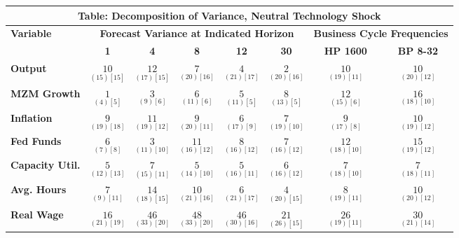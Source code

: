 \documentclass{article}
\begin{document}
 \begin{tabular}{|l|c|@{}c|c|@{}c|c|@{}c|c|} 
 \hline 
 \multicolumn{8}{|c|}{\textbf{Table: Decomposition of Variance, Neutral Technology Shock}} \\ \hline 
 \textbf{Variable} & \multicolumn{5}{|c}{\textbf{Forecast Variance at 
 Indicated Horizon}} & \multicolumn{2}{|c|}{\textbf{Business Cycle 
 Frequencies}} \\ \cline{2-8} 
 & \textbf{1} & \textbf{4} & \textbf{8} & \textbf{12} & \textbf{30} & \textbf{%
 HP 1600} & \textbf{BP 8-32} \\ \hline\hline 
 \textbf{Output} & $\underset{( 15) [ 15]}{ 10}$ & $\underset{( 17) [ 15]}{ 12}$ & $\underset{( 20) [ 16]}{  7}$ & $\underset{( 21) [ 17]}{  4}$ & $\underset{( 20) [ 16]}{  2}$ & $\underset{( 19) [ 11]}{ 10}$ & $\underset{( 20) [ 12]}{ 10}$ \\ \hline 
 \textbf{MZM Growth} & $\underset{(  4) [  5]}{  1}$ & $\underset{(  9) [  6]}{  3}$ & $\underset{( 11) [  6]}{  6}$ & $\underset{( 11) [  5]}{  5}$ & $\underset{( 13) [  5]}{  8}$ & $\underset{( 15) [  6]}{ 12}$ & $\underset{( 18) [ 10]}{ 16}$ \\ \hline 
 \textbf{Inflation} & $\underset{( 19) [ 18]}{  9}$ & $\underset{( 19) [ 12]}{ 11}$ & $\underset{( 20) [ 11]}{  9}$ & $\underset{( 17) [  9]}{  6}$ & $\underset{( 19) [ 10]}{  7}$ & $\underset{( 17) [  8]}{  9}$ & $\underset{( 19) [ 12]}{ 10}$ \\ \hline 
 \textbf{Fed Funds} & $\underset{(  7) [  8]}{  6}$ & $\underset{( 11) [ 10]}{  3}$ & $\underset{( 16) [ 12]}{ 11}$ & $\underset{( 16) [ 12]}{  8}$ & $\underset{( 16) [ 12]}{  7}$ & $\underset{( 18) [ 10]}{ 12}$ & $\underset{( 19) [ 12]}{ 15}$ \\ \hline 
 \textbf{Capacity Util.} & $\underset{( 12) [ 13]}{  5}$ & $\underset{( 15) [ 11]}{  7}$ & $\underset{( 14) [ 10]}{  5}$ & $\underset{( 16) [ 11]}{  5}$ & $\underset{( 16) [ 12]}{  6}$ & $\underset{( 18) [ 10]}{  7}$ & $\underset{( 18) [ 11]}{  7}$ \\ \hline 
 \textbf{Avg. Hours} & $\underset{(  9) [ 11]}{  7}$ & $\underset{( 18) [ 15]}{ 14}$ & $\underset{( 21) [ 16]}{ 10}$ & $\underset{( 21) [ 17]}{  6}$ & $\underset{( 20) [ 15]}{  4}$ & $\underset{( 19) [ 11]}{  8}$ & $\underset{( 20) [ 12]}{ 10}$ \\ \hline 
 \textbf{Real Wage} &  $\underset{( 21) [ 19]}{ 16}$ & $\underset{( 33) [ 20]}{ 46}$ & $\underset{( 33) [ 20]}{ 48}$ & $\underset{( 30) [ 16]}{ 46}$ & $\underset{( 26) [ 15]}{ 21}$ & $\underset{( 19) [ 11]}{ 26}$ & $\underset{( 21) [ 14]}{ 30}$ \\ \hline 

\end{tabular}
\end{document}
